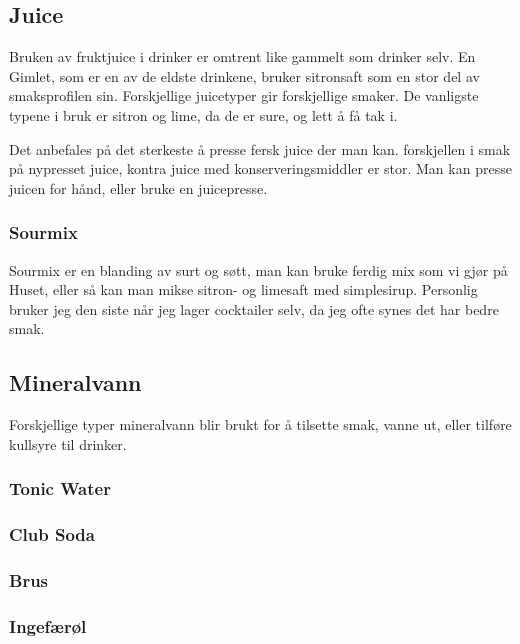 \subsection{Juice}
Bruken av fruktjuice i drinker er omtrent like gammelt som drinker selv. En Gimlet, som er en av de eldste drinkene, bruker sitronsaft som en stor del av smaksprofilen sin. Forskjellige juicetyper gir forskjellige smaker. De vanligste typene i bruk er sitron og lime, da de er sure, og lett å få tak i. 

Det anbefales på det sterkeste å presse fersk juice der man kan. forskjellen i smak på nypresset juice, kontra juice med konserveringsmiddler er stor. Man kan presse juicen for hånd, eller bruke en juicepresse.

\subsubsection{Sourmix}
Sourmix er en blanding av surt og søtt, man kan bruke ferdig mix som vi gjør på Huset, eller så kan man mikse sitron- og limesaft med simplesirup. Personlig bruker jeg den siste når jeg lager cocktailer selv, da jeg ofte synes det har bedre smak.

\subsection{Mineralvann}
Forskjellige typer mineralvann blir brukt for å tilsette smak, vanne ut, eller tilføre kullsyre til drinker.
\subsubsection{Tonic Water}

\subsubsection{Club Soda}

\subsubsection{Brus}

\subsubsection{Ingefærøl}
